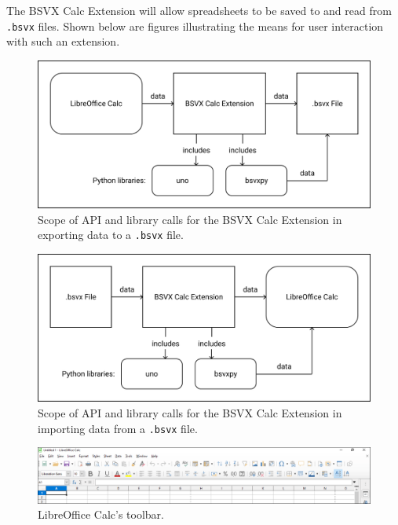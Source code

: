 \documentclass[10pt]{article}
\begin{document}
\indent{}
The BSVX Calc Extension will allow spreadsheets to be saved to and read from \texttt{.bsvx} files.
Shown below are figures illustrating the means for user interaction with such an extension.

\begin{figure}[htp]
\centering
\includegraphics[width=5in]{figures/dataToBsvx.png}
\caption{Scope of API and library calls for the BSVX Calc Extension in exporting data to a \texttt{.bsvx} file.}
\label{fig:deliverables_dataToBsvx}
\end{figure}

\begin{figure}[htp]
\centering
\includegraphics[width=5in]{figures/bsvxToData.png}
\caption{Scope of API and library calls for the BSVX Calc Extension in importing data from a \texttt{.bsvx} file.}
\label{fig:deliverables_bsvxToData}
\end{figure}

\begin{figure}[htp]
\centering
\includegraphics[width=\textwidth]{figures/mockupPart1.png}
\caption{LibreOffice Calc's toolbar.}
\label{fig:deliverables_mockupPart1}
\end{figure}
\end{document}
